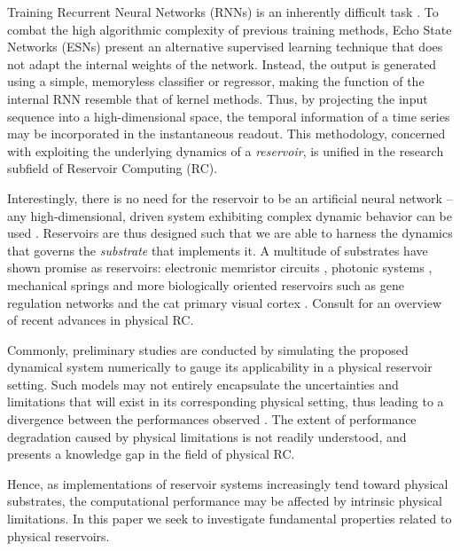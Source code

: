 Training Recurrent Neural Networks (RNNs) is an inherently difficult task
\cite{bengio_learning_1994}. To combat the high algorithmic complexity of
previous training methods, Echo State Networks (ESNs) \cite{jaeger_echo_2001}
present an alternative supervised learning technique that does not adapt the
internal weights of the network. Instead, the output is generated using a
simple, memoryless classifier or regressor, making the function of the internal
RNN resemble that of kernel methods. Thus, by projecting the input sequence into
a high-dimensional space, the temporal information of a time series may be
incorporated in the instantaneous readout. This methodology, concerned with
exploiting the underlying dynamics of a \textit{reservoir}, is unified in the
research subfield of Reservoir Computing (RC).

Interestingly, there is no need for the reservoir to be an artificial neural
network -- any high-dimensional, driven system exhibiting complex dynamic
behavior can be used \cite{schrauwen_overview_2007}. Reservoirs are thus
designed such that we are able to harness the dynamics that governs the
\textit{substrate} that implements it. A multitude of substrates have shown
promise as reservoirs: electronic memristor circuits
\cite{kulkarni_memristor-based_2012}, photonic systems
\cite{vandoorne_experimental_2014}, mechanical springs
\cite{hauser_towards_2011} and more biologically oriented reservoirs such as
gene regulation networks \cite{jones_is_2007} and the cat primary visual cortex
\cite{scholkopf_temporal_2007}. Consult \cite{tanaka_recent_2018} for an
overview of recent advances in physical RC.

Commonly, preliminary studies are conducted by simulating the proposed dynamical
system numerically to gauge its applicability in a physical reservoir
setting. Such models may not entirely encapsulate the uncertainties and
limitations that will exist in its corresponding physical setting, thus leading
to a divergence between the performances observed
\cite{vandoorne_experimental_2014, katumba_neuromorphic_2018,
jensen_reservoir_2017}. The extent of performance degradation caused by physical
limitations is not readily understood, and presents a knowledge gap in the field
of physical RC.

Hence, as implementations of reservoir systems increasingly tend toward physical
substrates, the computational performance may be affected by intrinsic physical
limitations. In this paper we seek to investigate fundamental properties related
to physical reservoirs.

